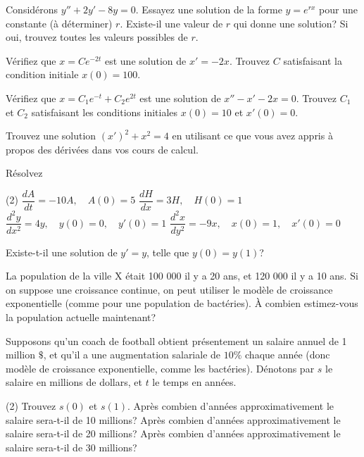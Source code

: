 \begin{exercise}
	Considérons $y'' + 2y' - 8y = 0$.  
	Essayez une solution de la forme $y = e^{rx}$ pour une constante (à déterminer) $r$.  
	Existe-il une valeur de $r$ qui donne une solution? Si oui, trouvez toutes les valeurs possibles de $r$.
\end{exercise}

\begin{exercise}
	Vérifiez que $x = C e^{-2t}$ est une solution de $x' = -2x$.
	Trouvez $C$ satisfaisant la condition initiale $x(0) = 100$.
\end{exercise}

\begin{exercise}
	Vérifiez que $x = C_1 e^{-t} + C_2 e^{2t}$ est une solution de $x'' - x' -2 x =	0$.  
	Trouvez $C_1$ et $C_2$ satisfaisant les conditions initiales $x(0) = 10$
	et $x'(0) = 0$.
\end{exercise}

\begin{exercise}
	Trouvez une solution
	${(x')}^2 + x^2 = 4$
	en utilisant ce que vous avez appris à propos des dérivées dans vos cours de calcul.
\end{exercise}

\begin{exercise}
	Résolvez 
	\begin{tasks}(2)
		\task $\dfrac{dA}{dt} = -10 A, \quad A(0)=5$
		\task $\dfrac{dH}{dx} = 3 H, \quad H(0)=1$
		\task $\dfrac{d^2y}{dx^2} = 4 y, \quad y(0)=0, \quad y'(0)=1$
		\task $\dfrac{d^2x}{dy^2} = -9 x, \quad x(0)=1, \quad x'(0)=0$
	\end{tasks}
\end{exercise}

\begin{exercise}
	Existe-t-il une solution de $y' = y$, telle que $y(0) = y(1)$?
\end{exercise}

\begin{exercise}
	La population de la ville X était 100 000 il y a 20 ans, et 120 000 il y a 10 ans.  
	Si on suppose une croissance continue, on peut utiliser le modèle de croissance exponentielle 
	(comme pour une population de bactéries). À combien estimez-vous la population actuelle maintenant?
\end{exercise}

\begin{exercise}
	Supposons qu'un coach de football obtient présentement un salaire annuel de 1 million $\$$, 
	et qu'il a une augmentation salariale de $10\%$ chaque année (donc modèle de croissance exponentielle, comme les bactéries).  
	Dénotons par $s$ le salaire en millions de dollars, et $t$ le temps en années.
	\begin{tasks}(2)
	\task Trouvez $s(0)$ et $s(1)$.
	\task Après combien d'années approximativement le salaire sera-t-il de 10 millions?
	\task Après combien d'années approximativement le salaire sera-t-il de 20 millions?
	\task Après combien d'années approximativement le salaire sera-t-il de 30 millions?
	\end{tasks}
\end{exercise}


